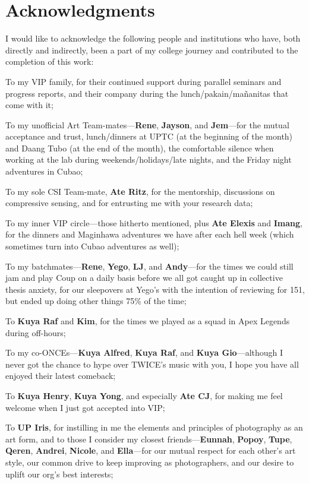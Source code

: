 \chapter*{Acknowledgments}

I would like to acknowledge the following people and institutions who have, both directly and indirectly, been a part of my college journey and contributed to the completion of this work:

To my VIP family, for their continued support during parallel seminars and progress reports, and their company during the lunch/pakain/ma\~{n}anitas that come with it;

To my unofficial Art Team-mates---\textbf{Rene}, \textbf{Jayson}, and \textbf{Jem}---for the mutual acceptance and trust, lunch/dinners at UPTC (at the beginning of the month) and Daang Tubo (at the end of the month), the comfortable silence when working at the lab during weekends/holidays/late nights, and the Friday night adventures in Cubao;

To my sole CSI Team-mate, \textbf{Ate Ritz}, for the mentorship, discussions on compressive sensing, and for entrusting me with your research data;

To my inner VIP circle---those hitherto mentioned, plus \textbf{Ate Elexis} and \textbf{Imang}, for the dinners and Maginhawa adventures we have after each hell week (which sometimes turn into Cubao adventures as well);

To my batchmates---\textbf{Rene}, \textbf{Yego}, \textbf{LJ}, and \textbf{Andy}---for the times we could still jam and play Coup on a daily basis before we all got caught up in collective thesis anxiety, for our sleepovers at Yego's with the intention of reviewing for 151, but ended up doing other things 75\% of the time;

To \textbf{Kuya Raf} and \textbf{Kim}, for the times we played as a squad in Apex Legends during off-hours;

To my co-ONCEs---\textbf{Kuya Alfred}, \textbf{Kuya Raf}, and \textbf{Kuya Gio}---although I never got the chance to hype over TWICE's music with you, I hope you have all enjoyed their latest comeback;

To \textbf{Kuya Henry}, \textbf{Kuya Yong}, and especially \textbf{Ate CJ}, for making me feel welcome when I just got accepted into VIP;

To \textbf{UP Iris}, for instilling in me the elements and principles of photography as an art form, and to those I consider my closest friends---\textbf{Eunnah}, \textbf{Popoy}, \textbf{Tupe}, \textbf{Qeren}, \textbf{Andrei}, \textbf{Nicole}, and \textbf{Ella}---for our mutual respect for each other's art style, our common drive to keep improving as photographers, and our desire to uplift our org's best interests;

